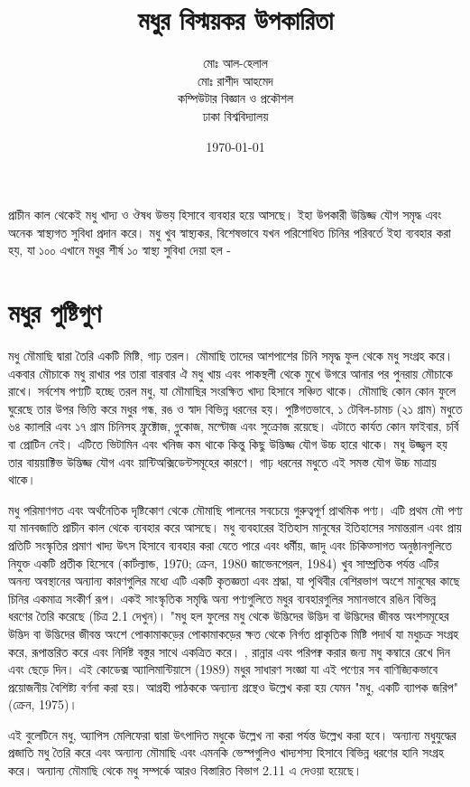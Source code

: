 \documentclass{article}
\title{মধুর বিস্ময়কর উপকারিতা}
\author{মোঃ আল-হেলাল\\মোঃ রাশীদ আহমেদ\\ কম্পিউটার বিজ্ঞান ও প্রকৌশল\\ ঢাকা বিশ্ববিদ্যালয়}
\date{\today}
\begin{document}
\maketitle

প্রাচীন কাল থেকেই মধু খাদ্য ও ঔষধ উভয় হিসাবে ব্যবহার হয়ে আসছে। ইহা উপকারী উদ্ভিজ্জ যৌগ সমৃদ্ধ এবং অনেক স্বাস্থ্যগত সুবিধা প্রদান করে। মধু খুব স্বাস্থ্যকর, বিশেষভাবে যখন পরিশোধিত চিনির পরিবর্তে ইহা ব্যবহার করা হয়, যা ১০০%
এখানে মধুর শীর্ষ ১০ স্বাস্থ্য সুবিধা দেয়া হল -\\

\section{মধুর পুষ্টিগুণ}
মধু মৌমাছি দ্বারা তৈরি একটি মিষ্টি, গাঢ় তরল। মৌমাছি তাদের আশপাশের চিনি সমৃদ্ধ ফুল থেকে মধু সংগ্রহ করে। একবার মৌচাকে মধু রাখার পর তারা বারবার ঐ মধু খায় এবং পাকস্থলী থেকে মুখে উগরে আনার পর পুনরায় মৌচাকে রাখে। সর্বশেষ পণ্যটি হচ্ছে তরল মধু, যা মৌমাছির সংরক্ষিত খাদ্য হিসাবে সঞ্চিত থাকে। মৌমাছি কোন কোন ফুলে ঘুরেছে তার উপর ভিত্তি করে মধুর গন্ধ, রঙ ও স্বাদ বিভিন্ন ধরনের হয়। পুষ্টিগতভাবে, ১ টেবিল-চামচ (২১ গ্রাম) মধুতে ৬৪ ক্যালরি এবং ১৭ গ্রাম চিনিসহ ফ্রুক্টোজ, গ্লুকোজ, মল্টোজ এবং সুক্রোজ রয়েছে। এটাতে কার্যত কোন ফাইবার, চর্বি বা প্রোটিন নেই। এটিতে ভিটামিন এবং খনিজ কম থাকে কিন্তু কিছু উদ্ভিজ্জ যৌগ উচ্চ হারে থাকে। মধু উজ্জ্বল হয় তার বায়য়াক্টিভ উদ্ভিজ্জ যৌগ এবং য়ান্টিঅক্সিডেন্টসমূহের কারণে। গাঢ় ধরনের মধুতে এই সমস্ত যৌগ উচ্চ মাত্রায় থাকে।

মধু পরিমাণগত এবং অর্থনৈতিক দৃষ্টিকোণ থেকে মৌমাছি পালনের সবচেয়ে গুরুত্বপূর্ণ প্রাথমিক পণ্য। এটি প্রথম মৌ পণ্য যা মানবজাতি প্রাচীন কাল থেকে ব্যবহার করে আসছে। 
মধু ব্যবহারের ইতিহাস মানুষের ইতিহাসের সমান্তরাল এবং প্রায় প্রতিটি সংস্কৃতির প্রমাণ খাদ্য উৎস হিসাবে ব্যবহার করা যেতে পারে এবং ধর্মীয়, জাদু এবং চিকিত্সাগত অনুষ্ঠানগুলিতে নিযুক্ত একটি প্রতীক হিসেবে (কার্টল্যান্ড, 1970; ক্রেন, 1980 জাভেনপেরল, 1984) খুব সাম্প্রতিক পর্যন্ত এটির অনন্য অবস্থানের অন্যান্য কারণগুলির মধ্যে এটি একটি কৃতজ্ঞতা এবং শ্রদ্ধা, যা পৃথিবীর বেশিরভাগ অংশে মানুষের কাছে চিনির একমাত্র সংকীর্ণ রূপ। একই সাংস্কৃতিক সমৃদ্ধি অন্য পণ্যগুলিতে মধুর ব্যবহারগুলির সমানভাবে রঙিন বিভিন্ন ধরণের তৈরি করেছে (চিত্র 2.1 দেখুন)।
"মধু হল ফুলের মধু থেকে উদ্ভিদের উদ্ভিদ বা উদ্ভিদের জীবন্ত অংশসমূহের উদ্ভিদ বা উদ্ভিদের জীবন্ত অংশে পোকামাকড়ের পোকামাকড়ের ক্ষত থেকে নির্গত প্রাকৃতিক মিষ্টি পদার্থ যা মধুচক্র সংগ্রহ করে, রূপান্তরিত করে এবং নির্দিষ্ট বস্তুর সাথে একত্রিত করে। , রান্নার এবং পরিপক্ব করার জন্য মধু কম্বারে রেখে দিন এবং ছেড়ে দিন। এই কোডেক্স অ্যালিমান্টিয়াসে (1989) মধুর সাধারণ সংজ্ঞা যা এই পণ্যের সব বাণিজ্যিকভাবে প্রয়োজনীয় বৈশিষ্ট্য বর্ণনা করা হয়। আগ্রহী পাঠককে অন্যান্য গ্রন্থেও উল্লেখ করা হয় যেমন "মধু, একটি ব্যাপক জরিপ" (ক্রেন, 1975)।

এই বুলেটিনে মধু, অ্যাপিস মেলিফেরা দ্বারা উৎপাদিত মধুকে উল্লেখ না করা পর্যন্ত উল্লেখ করা হবে। অন্যান্য মধুযুদ্ধের প্রজাতি মধু তৈরি করে এবং অন্যান্য মৌমাছি এবং এমনকি ভেস্পগুলিও খাদ্যশস্য হিসাবে বিভিন্ন ধরণের হানি সংগ্রহ করে। অন্যান্য মৌমাছি থেকে মধু সম্পর্কে আরও বিস্তারিত বিভাগ 2.11 এ দেওয়া হয়েছে।
\end{document}
